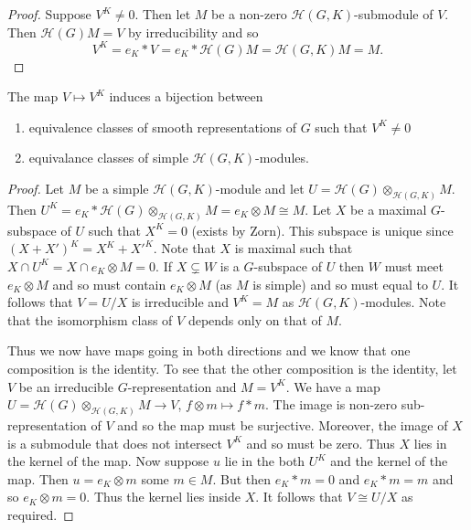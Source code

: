 \documentclass{memoir}
\begin{document}
\begin{proof}
    Suppose $V^K\ne 0$. Then let $M$ be a non-zero $\mathcal H(G,K)$-submodule of $V$.
    Then $\mathcal H(G)M = V$ by irreducibility and so 
    \begin{equation}
        V^K = e_K*V = e_K*\mathcal H(G) M = \mathcal H(G,K) M = M.
    \end{equation}
\end{proof}
\begin{proposition}
    \label{prop:bij}
    The map $V\mapsto V^K$ induces a bijection between
    \begin{enumerate}
        \item equivalence classes of smooth representations of $G$ such that $V^K\ne 0$
        \item equivalance classes of simple $\mathcal H(G,K)$-modules.
    \end{enumerate}
\end{proposition}
\begin{proof}
    Let $M$ be a simple $\mathcal H(G,K)$-module and let $U = \mathcal H(G)\otimes_{\mathcal H(G,K)}M$.
    Then $U^K = e_K*\mathcal H(G)\otimes_{\mathcal H(G,K)}M = e_K\otimes M \cong M$.
    Let $X$ be a maximal $G$-subspace of $U$ such that $X^K=0$ (exists by Zorn).
    This subspace is unique since $(X+X')^K = X^K+X'^K$.
    Note that $X$ is maximal such that $X\cap U^K  = X\cap e_K\otimes M = 0$.
    If $X\subsetneq W$ is a $G$-subspace of $U$ then $W$ must meet $e_K\otimes M$ and so must contain $e_K\otimes M$ (as $M$ is simple) and so must equal to $U$.
    It follows that $V = U/X$ is irreducible and $V^K = M$ as $\mathcal H(G,K)$-modules.
    Note that the isomorphism class of $V$ depends only on that of $M$.

    Thus we now have maps going in both directions and we know that one composition is the identity.
    To see that the other composition is the identity, let $V$ be an irreducible $G$-representation and $M = V^K$.
    We have a map $U = \mathcal H(G)\otimes_{\mathcal H(G,K)}M \to V$, $f\otimes m \mapsto f*m$.
    The image is non-zero sub-representation of $V$ and so the map must be surjective.
    Moreover, the image of $X$ is a submodule that does not intersect $V^K$ and so must be zero.
    Thus $X$ lies in the kernel of the map.
    Now suppose $u$ lie in the both $U^K$ and the kernel of the map.
    Then $u = e_K\otimes m$ some $m\in M$.
    But then $e_K*m = 0$ and $e_K*m = m$ and so $e_K\otimes m = 0$.
    Thus the kernel lies inside $X$.
    It follows that $V\cong U/X$ as required.
\end{proof}
\end{document}
